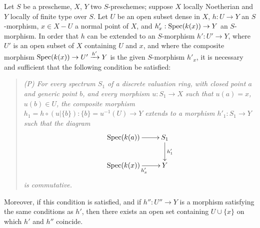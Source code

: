 \begin{proposition}[20.4.6]
\label{IV.20.4.6}
Let $S$ be a prescheme, $X$, $Y$ two $S$-preschemes; suppose $X$ locally Noetherian and $Y$ locally of finite type over $S$.
Let $U$ be an open subset dense in $X$, $h:U\to Y$ an $S$-morphism, $x\in X-U$ a normal point of $X$, and $h'_x:\operatorname{Spec}(k(x))\to Y$ an $S$-morphism.
In order that $h$ can be extended to an $S$-morphism $h':U'\to Y$, where $U'$ is an open subset of $X$ containing $U$ and $x$, and where the composite morphism $\operatorname{Spec}(k(x))\to U'\xrightarrow{h'}Y$ is the given $S$-morphism $h'_x$, it is necessary and sufficient that the following condition be satisfied:
\begin{quote}
\emph{(P) For every spectrum $S_1$ of a discrete valuation ring, with closed point $a$ and generic point $b$, and every morphism $u:S_1\to X$ such that $u(a)=x$, $u(b)\in U$, the composite morphism $h_1=h\circ(u|\{b\}):\{b\}=u^{-1}(U)\to Y$ extends to a morphism $h'_1:S_1\to Y$ such that the diagram}
\[
  \xymatrix{
  \Spec(k(a)) \ar[r] & S_1 \ar[d]^{h'_1} \\
  \Spec(k(x)) \ar[r]_{h'_x} & Y
  }
\]
\emph{is commutative.}
\end{quote}
Moreover, if this condition is satisfied, and if $h'':U''\to Y$ is a morphism satisfying the same conditions as $h'$, then there exists an open set containing $U\cup\{x\}$ on which $h'$ and $h''$ coincide.
\end{proposition}

